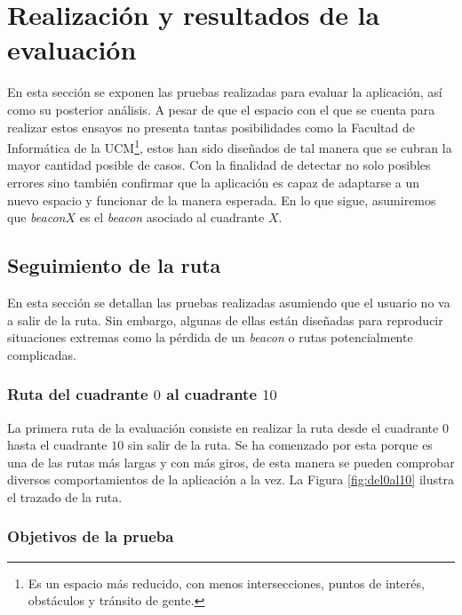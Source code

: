 \section{Realización y resultados de la evaluación}
\label{sec:realizYresult}

En esta sección se exponen las pruebas realizadas para evaluar la aplicación, así como su posterior análisis. A pesar de que el espacio con el que se cuenta para realizar estos ensayos no presenta tantas posibilidades como la Facultad de Informática de la UCM\footnote{Es un espacio más reducido, con menos intersecciones, puntos de interés, obstáculos y tránsito de gente.}, estos han sido diseñados de tal manera que se cubran la mayor cantidad posible de casos. Con la finalidad de detectar no solo posibles errores sino también confirmar que la aplicación es capaz de adaptarse a un nuevo espacio y funcionar de la manera esperada. En lo que sigue, asumiremos que \textit{beacon$X$} es el \textit{beacon} asociado al cuadrante $X$. 

\subsection{Seguimiento de la ruta}
En esta sección se detallan las pruebas realizadas asumiendo que el usuario no va a salir de la ruta. Sin embargo, algunas de ellas están diseñadas para reproducir situaciones extremas como la pérdida de un \textit{beacon} o rutas potencialmente complicadas.


\subsubsection{Ruta del cuadrante $0$ al cuadrante $10$}
\label{subsub:0al10}
La primera ruta de la evaluación consiste en realizar la ruta desde el cuadrante $0$ hasta el cuadrante $10$ sin salir de la ruta. Se ha comenzado por esta porque es una de las rutas más largas y con más giros, de esta manera se pueden comprobar diversos comportamientos de la aplicación a la vez. La Figura \ref{fig:del0al10} ilustra el trazado de la ruta.


\subsubsection*{Objetivos de la prueba}

